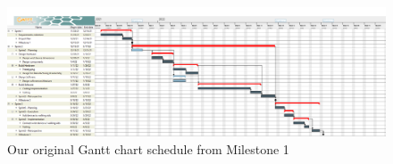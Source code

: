 \begin{figure}[H]
	\centering
	\captionsetup{width=1.0\linewidth}


	\includegraphics[width=1.0\linewidth]{graphics/ganttm1.png}

	\caption[Milestone 1 Gantt Chart]{Our original Gantt chart schedule from Milestone 1 \cite{coaker}}

	\label{fig:ganttm1-2}

\end{figure}